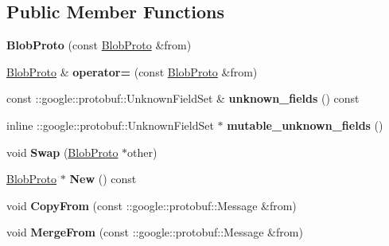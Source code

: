 \subsection*{Public Member Functions}
\begin{DoxyCompactItemize}
\item 
\mbox{\label{classcaffe_1_1_blob_proto_ab9edd41103105f45e7bd796e64103492}} 
{\bfseries Blob\+Proto} (const \mbox{\hyperlink{classcaffe_1_1_blob_proto}{Blob\+Proto}} \&from)
\item 
\mbox{\label{classcaffe_1_1_blob_proto_ae36050dd6bb5ad0931ab8fe6b0396c03}} 
\mbox{\hyperlink{classcaffe_1_1_blob_proto}{Blob\+Proto}} \& {\bfseries operator=} (const \mbox{\hyperlink{classcaffe_1_1_blob_proto}{Blob\+Proto}} \&from)
\item 
\mbox{\label{classcaffe_1_1_blob_proto_a7d44c2677044cf9e9c5b5048f068e701}} 
const \+::google\+::protobuf\+::\+Unknown\+Field\+Set \& {\bfseries unknown\+\_\+fields} () const
\item 
\mbox{\label{classcaffe_1_1_blob_proto_acaa3319fba3550fff66cdd96225fe015}} 
inline \+::google\+::protobuf\+::\+Unknown\+Field\+Set $\ast$ {\bfseries mutable\+\_\+unknown\+\_\+fields} ()
\item 
\mbox{\label{classcaffe_1_1_blob_proto_ab2bcb5519fcbf4194235e8176b0f9c03}} 
void {\bfseries Swap} (\mbox{\hyperlink{classcaffe_1_1_blob_proto}{Blob\+Proto}} $\ast$other)
\item 
\mbox{\label{classcaffe_1_1_blob_proto_aecbefefba4df5a880821c1761277c0b6}} 
\mbox{\hyperlink{classcaffe_1_1_blob_proto}{Blob\+Proto}} $\ast$ {\bfseries New} () const
\item 
\mbox{\label{classcaffe_1_1_blob_proto_a3d25a86143488facc370f070fe902364}} 
void {\bfseries Copy\+From} (const \+::google\+::protobuf\+::\+Message \&from)
\item 
\mbox{\label{classcaffe_1_1_blob_proto_a1760a0fca849a41e1b235dc015591160}} 
void {\bfseries Merge\+From} (const \+::google\+::protobuf\+::\+Message \&from)

\end{DoxyCompactItemize}
